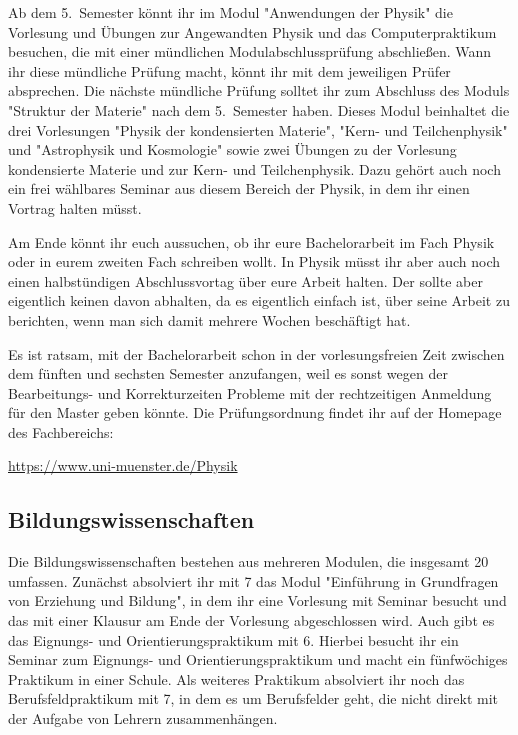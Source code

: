 \begin{multicols*}{2}
Ab dem 5.~Semester könnt ihr im Modul "Anwendungen der Physik" die Vorlesung und Übungen zur Angewandten Physik und das Computerpraktikum besuchen, die mit einer mündlichen Modulabschlussprüfung abschließen.
Wann ihr diese mündliche Prüfung macht, könnt ihr mit dem jeweiligen Prüfer absprechen.
Die nächste mündliche Prüfung solltet ihr zum Abschluss des Moduls "Struktur der Materie" nach dem 5.~Semester haben.
Dieses Modul beinhaltet die drei Vorlesungen "Physik der kondensierten Materie", "Kern- und Teilchenphysik" und "Astrophysik und Kosmologie" sowie zwei Übungen zu der Vorlesung kondensierte Materie und zur Kern- und Teilchenphysik.
Dazu gehört auch noch ein frei wählbares Seminar aus diesem Bereich der Physik, in dem ihr einen Vortrag halten müsst.

Am Ende könnt ihr euch aussuchen, ob ihr eure Bachelorarbeit im Fach Physik oder in eurem zweiten Fach schreiben wollt.
In Physik müsst ihr aber auch noch einen halbstündigen Abschlussvortag über eure Arbeit halten.
Der sollte aber eigentlich keinen davon abhalten, da es eigentlich einfach ist, über seine Arbeit zu berichten, wenn man sich damit mehrere Wochen beschäftigt hat.

Es ist ratsam, mit der Bachelorarbeit schon in der vorlesungsfreien Zeit zwischen dem fünften und sechsten Semester anzufangen, weil es sonst wegen der Bearbeitungs- und Korrekturzeiten Probleme mit der rechtzeitigen Anmeldung für den Master geben könnte.
Die Prüfungsordnung findet ihr auf der \foreignlanguage{english}{Homepage} des Fachbereichs:
\begin{center}
	\url{https://www.uni-muenster.de/Physik}
\end{center}

\subsection{Bildungswissenschaften}
Die Bildungswissenschaften bestehen aus mehreren Modulen, die insgesamt \SI{20}{\LP} umfassen.
Zunächst absolviert ihr mit \SI{7}{\LP} das Modul "Einführung in Grundfragen von Erziehung und Bildung", in dem ihr eine Vorlesung mit Seminar besucht und das mit einer Klausur am Ende der Vorlesung abgeschlossen wird.
Auch gibt es das Eignungs- und Orientierungspraktikum mit \SI{6}{\LP}.
Hierbei besucht ihr ein Seminar zum Eignungs- und Orientierungspraktikum und macht ein fünfwöchiges Praktikum in einer Schule.
Als weiteres Praktikum absolviert ihr noch das Berufsfeldpraktikum mit \SI{7}{\LP}, in dem es um Berufsfelder geht, die nicht direkt mit der Aufgabe von Lehrern zusammenhängen.


\end{multicols*}
